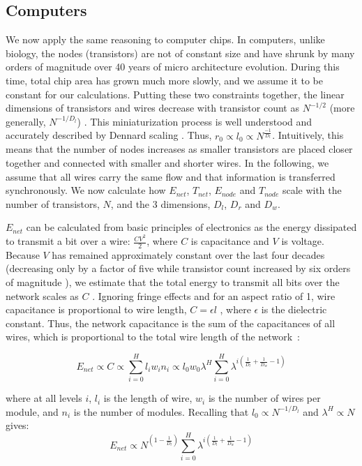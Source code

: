 \documentclass[12pt]{article}
\begin{document}
\subsection{Computers}
\label{sec:computers}

We now apply the same reasoning to computer chips. 
In computers, unlike biology, the nodes (transistors) 
are not of constant size and have shrunk by many orders of magnitude over 40
years of micro architecture evolution.  During this time, total chip area has grown
much more slowly, and we assume it to be constant for our calculations.
Putting these two constraints together, the linear dimensions of transistors
and wires decrease with transistor count as $N^{-1/2}$ (more generally,
$N^{-1/D_l}$) \cite{moses08}.  This miniaturization process is well understood
and accurately described by Dennard scaling \cite{dennard74}.  
Thus, $r_0 \propto l_0 \propto N^{\frac{-1}{D_l}}$. Intuitively, this means
that the number of nodes increases as smaller transistors are placed closer
together and connected with smaller and shorter wires. In the following,
we assume that all wires carry the same flow and that information is
transferred synchronously. We now calculate how $E_{net}$, $T_{net}$,
$E_{node}$ and $T_{node}$ scale with the number of transistors, $N$, and the 3
dimensions, $D_l$, $D_r$ and $D_w$.

$E_{net}$ can be calculated from basic principles of electronics as the energy
dissipated to transmit a bit over a wire: $\frac{CV^2}{2}$, where $C$ is
capacitance and $V$ is voltage.  Because $V$ has remained approximately
constant over the last four decades (decreasing only by a factor of five while
transistor count increased by six orders of magnitude \cite{ning07}), we
estimate that the total energy to transmit all bits over the network scales as
$C$ \cite{bingham08}.  Ignoring fringe effects and for an aspect ratio of 1,
wire capacitance is proportional to wire length, $C = \epsilon l$
\cite{wilhelm95}, where $\epsilon$ is the dielectric constant. Thus, the
network capacitance is the sum of the capacitances of all wires, which is
proportional to the total wire length of the network~\cite{donath79}:

\begin{equation}
  \label{eq:ChipsEnet}
  E_{net} \propto C \propto  \sum_{i=0}^H l_i w_i n_i \propto l_0 w_0 \lambda^H
\sum_{i=0}^H \lambda^{i \left( \frac{1}{D_l} + \frac{1}{D_w} -1 \right)}
\end{equation}

\noindent where at all levels $i$, $l_i$ is the length of wire, $w_i$ is the number of wires per
module, and $n_i$ is the number of modules. Recalling that
$l_0 \propto N^{-1/D_l}$ and $\lambda^H \propto N$ gives: 
\begin{equation}
\label{eq:comp-Enet}
  E_{net}  \propto  N^{(1- \frac{1}{D_l})} \sum_{i=0}^H \lambda^{i \left( 
\frac{1}{D_l} + \frac{1}{D_w} -1 \right)}
\end{equation}
\end{document}
